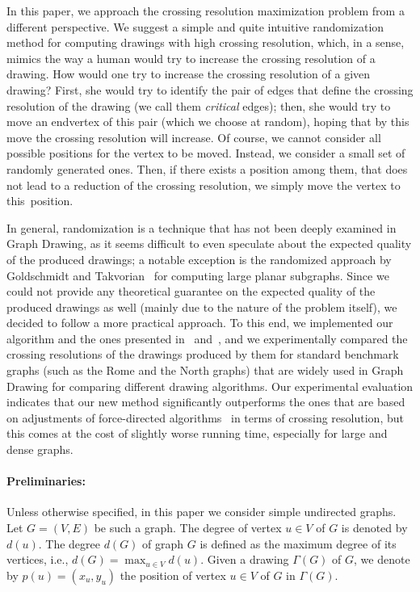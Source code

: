 \documentclass[runningheads]{llncs}
\begin{document}
In this paper, we approach the crossing resolution maximization problem from a different perspective. We suggest a simple and quite intuitive randomization method for computing drawings with high crossing resolution, which, in a sense, mimics the way a human would try to increase the crossing resolution of a drawing. How would one try to increase the crossing resolution of a given drawing? First, she would try to identify the pair of edges that define the crossing resolution of the drawing (we call them \emph{critical} edges); then, she would try to move an endvertex of this pair (which we choose at random), hoping that by this move the crossing resolution will increase. Of course, we cannot consider all possible positions for the vertex to be moved. Instead, we consider a small set of randomly generated ones. Then, if there exists a position among them, that does not lead to a reduction of the crossing resolution, we simply move the vertex to this~position.

In general, randomization is a technique that has not been deeply examined in Graph Drawing, as it seems difficult to even speculate about the expected quality of the produced drawings; a notable exception is the randomized approach by Goldschmidt and Takvorian~\cite{DBLP:journals/networks/GoldschmidtT94} for computing large planar subgraphs. Since we could not provide any theoretical guarantee on the expected quality of the produced drawings as well (mainly due to the nature of the problem itself), we decided to follow a more practical approach. To this end, we implemented our algorithm and the ones presented in~\cite{DBLP:journals/vlc/HuangEHL13} and~\cite{DBLP:journals/cj/ArgyriouBS13}, and we experimentally compared the crossing resolutions of the drawings produced by them for standard benchmark graphs (such as the Rome and the North graphs) that are widely used in Graph Drawing for comparing different drawing algorithms. Our experimental evaluation indicates that our new method significantly outperforms the ones that are based on adjustments of force-directed algorithms~\cite{DBLP:journals/vlc/HuangEHL13,DBLP:journals/cj/ArgyriouBS13} in terms of crossing resolution, but this comes at the cost of slightly worse running time, especially for large and dense graphs. 

\paragraph{Preliminaries:}
Unless otherwise specified, in this paper we consider simple undirected graphs. Let $G=(V,E)$ be such a graph. The degree of vertex $u\in V$ of $G$ is denoted by $d(u)$. The degree $d(G)$ of  graph $G$ is defined as the maximum degree of its vertices, i.e., $d(G)=\max_{u\in V}d(u)$.
%
Given a drawing $\Gamma(G)$ of $G$, we denote by $p(u)=(x_u,y_u)$ the position of vertex $u \in V$ of $G$ in $\Gamma(G)$. %
\end{document}
